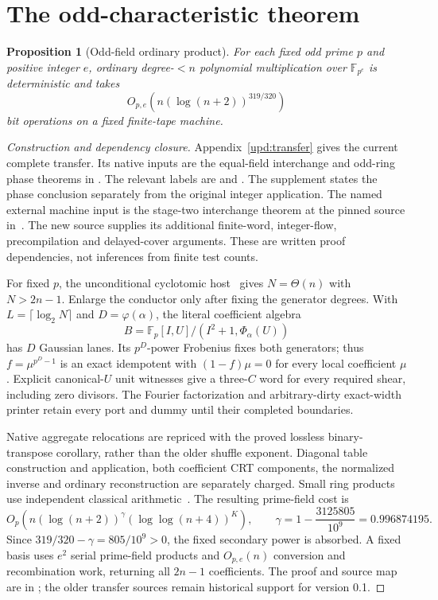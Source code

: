 \documentclass[11pt]{article}
\newtheorem{proposition}{Proposition}
\theoremstyle{definition}
\newcommand{\F}{\mathbb F}
\begin{document}
\section{The odd-characteristic theorem}
\begin{proposition}[Odd-field ordinary product]
\label{prop:odd}
For each fixed odd prime $p$ and positive integer $e$, ordinary
degree-$<n$ polynomial multiplication over $\F_{p^e}$ is deterministic
and takes
\[
  O_{p,e}\!\left(n(\log(n+2))^{319/320}\right)
\]
bit operations on a fixed finite-tape machine.
\end{proposition}
\begin{proof}[Construction and dependency closure]
Appendix~\ref{upd:transfer} gives the current complete transfer. Its
native inputs are the equal-field interchange and odd-ring phase
theorems in .
The relevant labels are  and
.
The supplement states the phase conclusion separately from the original
integer application. The named external machine input is the stage-two
interchange theorem at the pinned source in~\cite{Stage2Machine26}.
The new source supplies its additional finite-word, integer-flow,
precompilation and delayed-cover arguments. These are written proof
dependencies, not inferences from finite test counts.

For fixed $p$, the unconditional cyclotomic host~\cite{HVH19Cyclo}
gives $N=\Theta(n)$ with $N>2n-1$. Enlarge the conductor only after
fixing the generator degrees. With $L=\lceil\log_2N\rceil$ and
$D=\varphi(\alpha)$, the literal coefficient algebra
\[
 B=\F_p[I,U]/(I^2+1,\Phi_\alpha(U))
\]
has $D$ Gaussian lanes. Its $p^D$-power Frobenius fixes both generators;
thus $f=\mu^{p^D-1}$ is an exact idempotent with $(1-f)\mu=0$ for
every local coefficient $\mu$. Explicit canonical-$U$ unit witnesses
give a three-$C$ word for every required shear, including zero divisors.
The Fourier factorization and arbitrary-dirty exact-width printer
retain every port and dummy until their completed boundaries.

Native aggregate relocations are repriced with the proved lossless
binary-transpose corollary, rather than the older shuffle exponent.
Diagonal table construction and application, both coefficient CRT
components, the normalized inverse and ordinary reconstruction are
separately charged. Small ring products use independent classical
arithmetic~\cite{SS71,BrentZimmermann10}. The resulting prime-field cost is
\[
 O_p\!\left(n(\log(n+2))^\gamma
                    (\log\log(n+4))^K\right),\qquad
 \gamma=1-\frac{3125805}{10^9}=0.996874195.
\]
Since $319/320-\gamma=805/10^9>0$, the fixed secondary power is
absorbed. A fixed basis uses $e^2$ serial prime-field products and
$O_{p,e}(n)$ conversion and recombination work, returning all $2n-1$
coefficients. The proof and source map are in
; the older transfer sources remain
historical support for version 0.1.
\end{proof}
\end{document}
